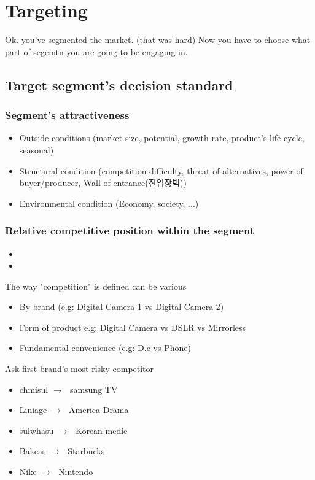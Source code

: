 \documentclass[12pt]{article}
\newcommand{\ra}{$\rightarrow \text{ }$}
\newcommand{\nii}{\noindent}
\begin{document}
\section{Targeting}

Ok. you've segmented the market. (that was hard) Now you have to choose what part of segemtn you are going to be engaging in.

\subsection{Target segment's decision standard}

\subsubsection{Segment's attractiveness}
\begin{itemize}
	\item Outside conditions (market size, potential, growth rate, product's life cycle, seasonal)
	\item Structural condition (competition difficulty, threat of alternatives, power of buyer/producer, Wall of entrance(진입장벽))
	\item Environmental condition (Economy, society, ...)
\end{itemize}
\subsubsection{Relative competitive position within the segment}

\begin{itemize}
	\item %
	\item %
\end{itemize}
{\large The way "competition" is defined can be various}
\nii
\begin{itemize}
	\item By brand (e.g: Digital Camera 1 vs Digital Camera 2)
	\item Form of product {e.g: Digital Camera vs DSLR vs Mirrorless}
	\item Fundamental convenience (e.g: D.c vs Phone)
\end{itemize}
\nii
Ask first brand's most risky competitor

\begin{tcolorbox}
	\begin{itemize}
		\item chmisul \ra samsung TV
		\item Liniage \ra America Drama
		\item sulwhasu \ra Korean medic
		\item Bakcas \ra Starbucks
		\item Nike \ra Nintendo
	\end{itemize}
\end{tcolorbox}
\end{document}
